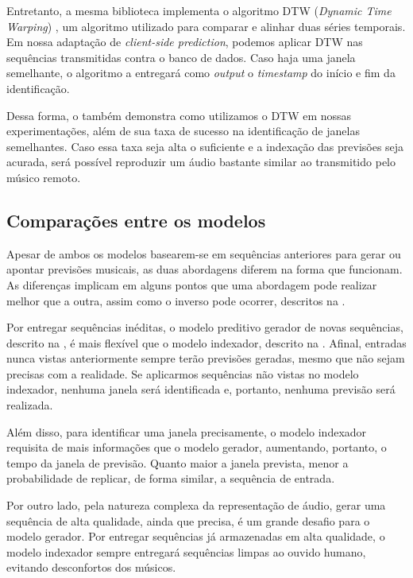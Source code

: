 Entretanto, a mesma biblioteca implementa o algoritmo DTW (\textit{Dynamic Time Warping}) \cite{dtw}, um algoritmo utilizado para comparar e alinhar duas séries temporais. Em nossa adaptação de \textit{client-side prediction}, podemos aplicar DTW nas sequências transmitidas contra o banco de dados. Caso haja uma janela semelhante, o algoritmo a entregará como \textit{output} o \textit{timestamp} do início e fim da identificação.

Dessa forma, o  também demonstra como utilizamos o DTW em nossas experimentações, além de sua taxa de sucesso na identificação de janelas semelhantes. Caso essa taxa seja alta o suficiente e a indexação das previsões seja acurada, será possível reproduzir um áudio bastante similar ao transmitido pelo músico remoto.

\subsection{Comparações entre os modelos}

Apesar de ambos os modelos basearem-se em sequências anteriores para gerar ou apontar previsões musicais, as duas abordagens diferem na forma que funcionam. As diferenças implicam em alguns pontos que uma abordagem pode realizar melhor que a outra, assim como o inverso pode ocorrer, descritos na .

Por entregar sequências inéditas, o modelo preditivo gerador de novas sequências, descrito na , é mais flexível que o modelo indexador, descrito na . Afinal, entradas nunca vistas anteriormente sempre terão previsões geradas, mesmo que não sejam precisas com a realidade. Se aplicarmos sequências não vistas no modelo indexador, nenhuma janela será identificada e, portanto, nenhuma previsão será realizada.

Além disso, para identificar uma janela precisamente, o modelo indexador requisita de mais informações que o modelo gerador, aumentando, portanto, o tempo da janela de previsão. Quanto maior a janela prevista, menor a probabilidade de replicar, de forma similar, a sequência de entrada. 

Por outro lado, pela natureza complexa da representação de áudio, gerar uma sequência de alta qualidade, ainda que precisa, é um grande desafio para o modelo gerador. Por entregar sequências já armazenadas em alta qualidade, o modelo indexador sempre entregará sequências limpas ao ouvido humano, evitando desconfortos dos músicos.

